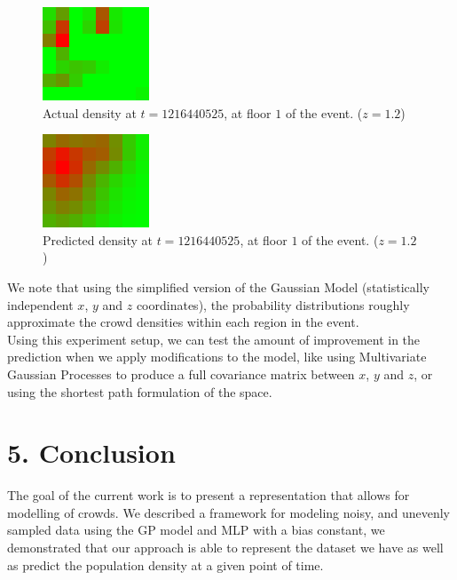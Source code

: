 \documentclass[letterpaper]{article}
\begin{document}
\begin{figure}[h!]
  \centering
    \includegraphics[width=120px,natwidth=320,natheight=280]{selected_renders/1_1216440525.png}
  \caption{Actual density at $t=1216440525$, at floor $1$ of the event. ($z = 1.2$)}
  \label{fig:t3dist}
\end{figure}

\begin{figure}[h!]
  \centering
    \includegraphics[width=120px,natwidth=320,natheight=280]{selected_renders/1_1216440525p.png}
  \caption{Predicted density at $t=1216440525$, at floor $1$ of the event. ($z = 1.2$)}
  \label{fig:t4dist}
\end{figure}

We note that using the simplified version of the Gaussian Model (statistically independent $x$, $y$ and $z$ coordinates), the probability distributions roughly approximate the crowd densities within each region in the event. \\

Using this experiment setup, we can test the amount of improvement in the prediction when we apply modifications to the model, like using Multivariate Gaussian Processes to produce a full covariance matrix between $x$, $y$ and $z$, or using the shortest path formulation of the space.

\section{5.  Conclusion}

The goal of the current work is to present a representation that allows for modelling of crowds. We described a framework for modeling noisy, and unevenly sampled
data using the GP model and MLP with a bias constant, we demonstrated that our approach is able to represent the dataset we have as well as predict the population density at a given point of time.
\end{document}
